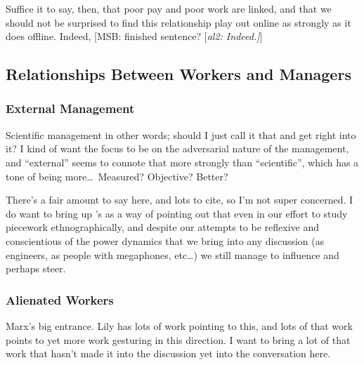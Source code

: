 \documentclass{sigchi}
\newcommand{\msb}[1]{{\color{PineGreen}[MSB: #1]}}
\newcommand{\ali}[1]{{\color{BrickRed}[\itshape al2: #1\upshape]}}
\begin{document}
Suffice it to say, then, that poor pay and poor work are linked,
and that we should not be surprised to find this relationship play out online as strongly as it does offline.
Indeed, \msb{finished sentence? \ali{Indeed.}}





\subsection{Relationships Between Workers and Managers}\label{sec:relationships}


\subsubsection{External Management}
\itshape

Scientific management in other words; should I just call it that and get right into it?
I kind of want the focus to be on the adversarial nature of the management,
and ``external'' seems to connote that more strongly than ``scientific'',
which has a tone of being more\dots~Measured? Objective? Better?

There's a fair amount to say here, and lots to cite, so I'm not super concerned.
I do want to bring up \citeauthor{storiesIraniSilberman}'s
 \cite{storiesIraniSilberman}
as a way of pointing out that even in our effort to study piecework ethnographically,
and despite our attempts to be reflexive and conscientious of
the power dynamics that we bring into any discussion
(as engineers, as people with megaphones, etc\dots)
we still manage to influence and perhaps steer.

\upshape



\subsubsection{Alienated Workers}
\itshape

Marx's big entrance. Lily has lots of work pointing to this, and
lots of that work points to yet more work gesturing in this direction.
I want to bring a lot of that work
that hasn't made it into the discussion yet
into the conversation here.
\end{document}
